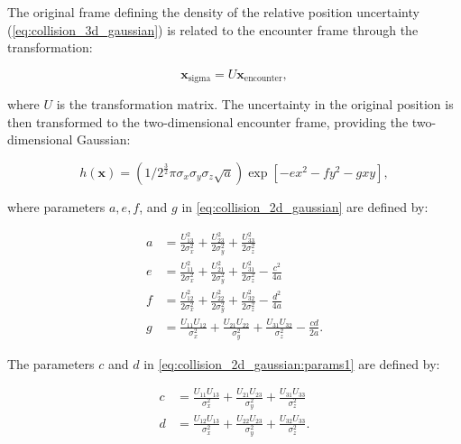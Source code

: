 The original frame defining the density of the relative position uncertainty (\autoref{eq:collision_3d_gaussian}) is related to the encounter frame through the transformation:

\begin{equation}
    \boldsymbol{x}_{\text {sigma}}=U \boldsymbol{x}_{\text {encounter}},
\end{equation}

where $U$ is the transformation matrix. The uncertainty in the original position is then transformed to the two-dimensional encounter frame, providing the two-dimensional Gaussian:

\begin{equation}
    h(\boldsymbol{x})=\left(1 / 2^{\frac{3}{2}} \pi \sigma_{x} \sigma_{y} \sigma_{z} \sqrt{a}\right) \exp \left[-e x^{2}-f y^{2}-g x y\right],
    \label{eq:collision_2d_gaussian}
\end{equation}

where parameters $a, e, f$, and $g$ in \autoref{eq:collision_2d_gaussian} are defined by:

\begin{equation}
    \begin{aligned}
        a&=\frac{U_{13}^{2}}{2 \sigma_{x}^{2}}+\frac{U_{23}^{2}}{2 \sigma_{y}^{2}}+\frac{U_{33}^{2}}{2 \sigma_{z}^{2}} \\
        e&=\frac{U_{11}^{2}}{2 \sigma_{x}^{2}}+\frac{U_{21}^{2}}{2 \sigma_{y}^{2}}+\frac{U_{31}^{2}}{2 \sigma_{z}^{2}}-\frac{c^{2}}{4 a} \\
        f&=\frac{U_{12}^{2}}{2 \sigma_{x}^{2}}+\frac{U_{22}^{2}}{2 \sigma_{y}^{2}}+\frac{U_{32}^{2}}{2 \sigma_{z}^{2}}-\frac{d^{2}}{4 a} \\
        g&=\frac{U_{11} U_{12}}{\sigma_{x}^{2}}+\frac{U_{21} U_{22}}{\sigma_{y}^{2}}+\frac{U_{31} U_{32}}{\sigma_{z}^{2}}-\frac{c d}{2 a}.
    \end{aligned}
    \label{eq:collision_2d_gaussian:params1}
\end{equation}

The parameters $c$ and $d$ in \autoref{eq:collision_2d_gaussian:params1} are defined by:

\begin{equation}
    \begin{alignat}{2}
        c&=\frac{U_{11} U_{13}}{\sigma_{x}^{2}}+\frac{U_{21} U_{23}}{\sigma_{y}^{2}}+\frac{U_{31} U_{33}}{\sigma_{z}^{2}} \label{eq:collision_2d_gaussian:c} \\
        d&=\frac{U_{12} U_{13}}{\sigma_{x}^{2}}+\frac{U_{22} U_{23}}{\sigma_{y}^{2}}+\frac{U_{32} U_{33}}{\sigma_{z}^{2}}. \label{eq:collision_2d_gaussian:d} 
    \end{alignat}
\end{equation}


